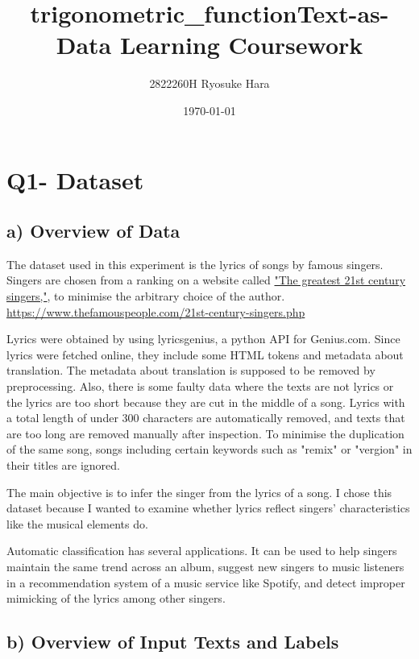 \documentclass[a4paper,11pt]{article}
\title{\vspace{-10cm}trigonometric_function}
\begin{document}
\title{Text-as-Data Learning Coursework}
\author{2822260H Ryosuke Hara}
\date{\today}
\maketitle

\section{Q1- Dataset}
\subsection{a) Overview of Data}%
The dataset used in this experiment is the lyrics of songs by famous singers. 
Singers are chosen from a ranking on a website called \href{https://www.thefamouspeople.com/21st-century-singers.php}{"The greatest 21st century singers,"}, to minimise the arbitrary choice of the author.
\small{\url{https://www.thefamouspeople.com/21st-century-singers.php}}

Lyrics were obtained by using lyricsgenius, a python API for Genius.com.
Since lyrics were fetched online, they include some HTML tokens and metadata about translation.
The metadata about translation is supposed to be removed by preprocessing.
Also, there is some faulty data where the texts are not lyrics or the lyrics are too short because they are cut in the middle of a song.
Lyrics with a total length of under 300 characters are automatically removed, and texts that are too long are removed manually after inspection.
To minimise the duplication of the same song, songs including certain keywords such as "remix" or "vergion" in their titles are ignored.


The main objective is to infer the singer from the lyrics of a song.
I chose this dataset because I wanted to examine whether lyrics reflect singers' characteristics like the musical elements do.

Automatic classification has several applications.
It can be used to help singers maintain the same trend across an album,
suggest new singers to music listeners in a recommendation system of a music service like Spotify, and
detect improper mimicking of the lyrics among other singers. 

\subsection{b) Overview of Input Texts and Labels}
\end{document}
